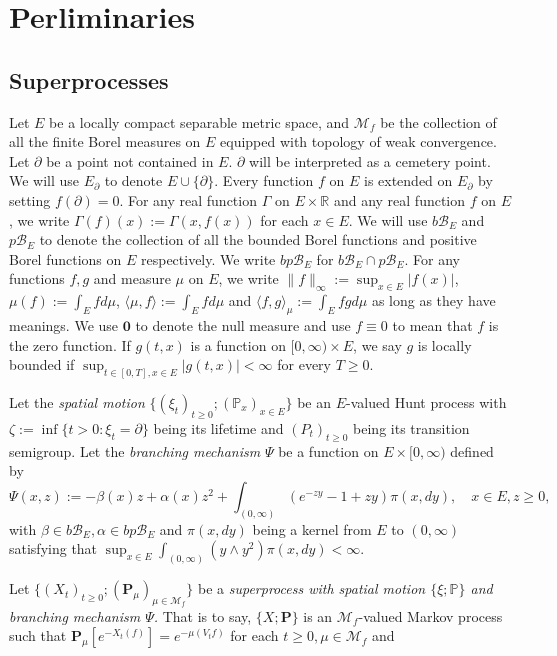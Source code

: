 \section{Perliminaries}

\subsection{Superprocesses}
	Let $E$ be a locally compact separable metric space, and $\mathcal M_f$ be the collection of all the finite Borel measures on $E$ equipped with topology of weak convergence.
	Let $\partial$ be a point not contained in $E$.
	$\partial$ will be interpreted as a cemetery point.
	We will use $E_\partial$ to denote $E\cup\{\partial\}$.
	Every function $f$ on $E$ is extended on $E_\partial$ by setting $f(\partial) = 0$.
	For any real function $\Gamma$ on $E \times \mathbb R$ and any real function $f$ on $E$, we write $ \Gamma (f)(x) := \Gamma(x,f(x))$ for each $ x\in E$.
	We will use $b\mathscr B_E$ and $p\mathscr B_E$ to denote the collection of all the bounded Borel functions and positive Borel functions on $E$ respectively.
	We write $bp\mathscr B_E$ for $b\mathscr B_E \cap p\mathscr B_E$.
	For any functions $f,g$ and measure $\mu$ on $E$, we write $\|f\|_\infty := \sup_{x\in E} |f(x)|$, $\mu(f) := \int_E f d\mu$, $\langle \mu,f \rangle := \int_E f d\mu$ and $\langle f,g \rangle_\mu := \int_E fg d\mu$ as long as they have meanings.
	We use $\mathbf 0$ to denote the null measure and use $f\equiv 0$ to mean that $f$ is the zero function.
	If $g(t,x)$ is a function on $[0,\infty)\times E$, we say $g$ is locally bounded if $\sup_{t\in [0,T],x\in E} |g(t,x)|<\infty$ for every $T\geq 0$.
\par
	Let the \emph{spatial motion} $\{(\xi_t)_{t\geq 0}; (\mathbb P_x)_{x\in E}\}$ be an $E$-valued Hunt process with $\zeta :=\inf\{t>0:\xi_t=\partial\}$ being its lifetime and $(P_t)_{t\geq 0}$ being its transition semigroup.
	Let the \emph{branching mechanism} $\Psi$ be a function on $E\times [0,\infty)$ defined by
\[
	\Psi(x,z)
	:=-\beta(x)z+\alpha(x)z^2+\int_{(0,\infty)}(e^{-zy}-1+zy)\pi(x,dy),
	\quad x\in E,z\geq 0,
\]
	with $\beta\in b\mathscr B_E,\alpha\in bp\mathscr B_E$ and $\pi(x,dy)$ being a kernel from $E$ to $(0,\infty)$ satisfying that $\sup_{x\in E} \int_{(0,\infty)} (y\wedge y^2) \pi(x,dy) < \infty$.
\par
	Let $\{(X_t)_{t\geq 0};(\mathbf P_\mu)_{\mu\in \mathcal M_f}\}$ be a \emph{superprocess with spatial motion $\{\xi;\mathbb P\}$ and branching mechanism $\Psi$.}
	That is to say, $\{X;\mathbf P\}$ is an $\mathcal M_f$-valued Markov process such that $\mathbf P_\mu[e^{-X_t(f)}] = e^{-\mu(V_tf)}$ for each $t \geq 0,\mu \in \mathcal M_f$ and
